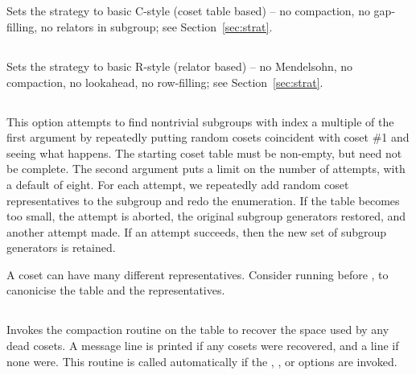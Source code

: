 \subsection{}

Sets the strategy to basic C-style (coset table based) -- 
  no compaction, no gap-filling, no relators in subgroup; 
  see Section~\ref{sec:strat}.

\subsection{}

Sets the strategy to basic R-style (relator based) -- 
  no Mendelsohn, no compaction, no lookahead, no row-filling;
  see Section~\ref{sec:strat}.

\subsection{}

This option attempts to find nontrivial subgroups with index a multiple
  of the first argument by repeatedly putting random cosets coincident
  with coset \#1 and seeing what happens.
The starting coset table must be non-empty, but need not be complete.
The second argument puts a limit on the number of attempts, with a default
  of eight.
For each attempt, we repeatedly add random coset representatives to the 
  subgroup and redo the enumeration.
If the table becomes too small, the attempt is aborted, the original 
  subgroup generators restored, and another attempt made.
If an attempt succeeds, then the new set of subgroup generators is
  retained.

A coset can have many different representatives.
Consider running  before , to canonicise the table and the
  representatives.

\subsection{}

Invokes the compaction routine on the table to recover the space used by
  any dead cosets.
A  message line is printed if any cosets were recovered, and a
   line if none were.
This routine is called automatically if the , , 
  or  options are invoked.

